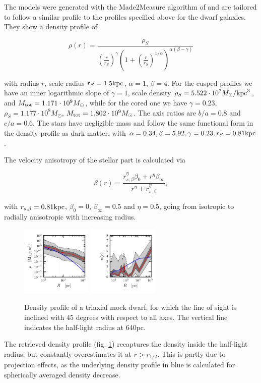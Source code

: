 The models were generated with the Made2Measure algorithm of
\cite{Dehnen2009} and are tailored to follow a similar profile to the
profiles specified above for the dwarf galaxies. They show a density
profile of

\begin{equation}
    \rho(r)=\frac{\rho_S}{\left(\frac{r}{r_S}\right)^\gamma\left(1+\left(\frac{r}{r_S}\right)^{1/\alpha}\right)^{\alpha(\beta-\gamma)}}
\end{equation}

with radius $r$, scale radius $r_S=1.5\mathrm{kpc}$, $\alpha=1$,
$\beta=4$. For the cusped profiles we have an inner logarithmic slope
of $\gamma=1$, scale density $\rho_S=5.522\cdot 10^7M_\odot/\mathrm{kpc}^3$,
and $M_{\mathrm{tot}}=1.171\cdot10^9M_\odot$, while for the cored one we have
$\gamma=0.23$, $\rho_S=1.177\cdot10^8M_\odot$,
$M_{\mathrm{tot}}=1.802\cdot10^9M_\odot$. The axis ratios are $b/a=0.8$ and
$c/a=0.6$. The stars have negligible mass and follow the same
functional form in the density profile as dark matter, with
$\alpha=0.34, \beta=5.92, \gamma=0.23, r_S=0.81\mathrm{kpc}$.

The velocity anisotropy of the stellar part is calculated via

\begin{equation}
    \beta(r)=\frac{r_{s,\beta}^\eta \beta_0+r^\eta \beta_\infty}{r^\eta+r_{s,\beta}^\eta},
\end{equation}

with $r_{s,\beta}=0.81\mathrm{kpc}$, $\beta_0=0$, $\beta_\infty=0.5$ and
$\eta=0.5$, going from isotropic to radially anisotropic with
increasing radius.

\begin{figure}
    \begin{center}
        \hspace{-7mm}
        \includegraphics[width=0.3\textwidth]{fig/prof_1_pop_triax/prof_rho_0.pdf}
        \includegraphics[width=0.3\textwidth]{fig/prof_1_pop_triax/prof_nr_0.pdf}
        \caption{Density profile of a triaxial mock dwarf, for which
          the line of sight is inclined with 45 degrees with respect
          to all axes. The vertical line indicates the half-light
          radius at 640pc.}
        \label{fig:triax}
    \end{center}
\end{figure}

The retrieved density profile (fig. \ref{fig:triax}) recaptures the
density inside the half-light radius, but constantly overestimates it
at $r>r_{1/2}$. This is partly due to projection effects, as the
underlying density profile in blue is calculated for spherically
averaged density decrease.
